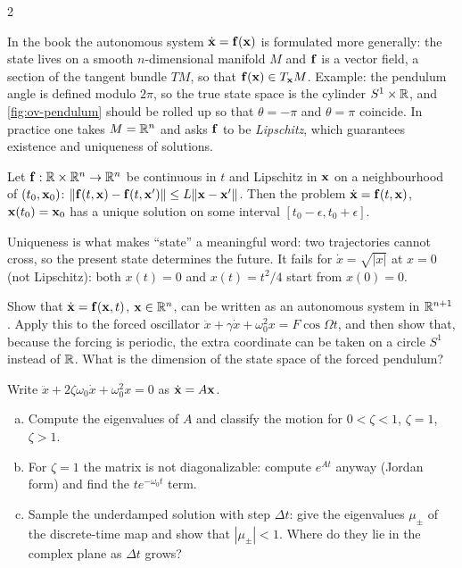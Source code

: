 \begin{paracol}{2}
\begin{secondary}
In the book the autonomous system $\dot{\mathbf{x}}=\mathbf{f}(\mathbf{x})$ is formulated more generally: the state
lives on a smooth $n$-dimensional manifold $M$ and $\mathbf{f}$ is a vector field, a section of the tangent
bundle $TM$, so that $\mathbf{f}(\mathbf{x})\in T_{\mathbf{x}}M$. Example: the pendulum angle is defined modulo
$2\pi$, so the true state space is the cylinder $S^1\times\mathbb{R}$, and \cref{fig:ov-pendulum} should be
rolled up so that $\theta=-\pi$ and $\theta=\pi$ coincide. In practice one takes $M=\mathbb{R}^n$ and asks
$\mathbf{f}$ to be \emph{Lipschitz}, which guarantees existence and uniqueness of solutions.
\begin{theorem}\label{thm:ov-picard}
Let $\mathbf{f}:\mathbb{R}\times\mathbb{R}^n\to\mathbb{R}^n$ be continuous in $t$ and Lipschitz in $\mathbf{x}$ on a neighbourhood of
$(t_0,\mathbf{x}_0)$: $\lVert\mathbf{f}(t,\mathbf{x})-\mathbf{f}(t,\mathbf{x}')\rVert\le L\lVert\mathbf{x}-\mathbf{x}'\rVert$. Then the
problem $\dot{\mathbf{x}}=\mathbf{f}(t,\mathbf{x})$, $\mathbf{x}(t_0)=\mathbf{x}_0$ has a unique solution on some interval
$[t_0-\epsilon,t_0+\epsilon]$.
\end{theorem}
Uniqueness is what makes ``state'' a meaningful word: two trajectories cannot cross, so the present
state determines the future. It fails for $\dot x=\sqrt{|x|}$ at $x=0$ (not Lipschitz): both $x(t)=0$
and $x(t)=t^2/4$ start from $x(0)=0$.
\end{secondary}

\begin{exercise}
Show that $\dot{\mathbf{x}}=\mathbf{f}(\mathbf{x},t)$, $\mathbf{x}\in\mathbb{R}^n$, can be written as an autonomous system in
$\mathbb{R}^{n+1}$. Apply this to the forced oscillator $\ddot x+\gamma\dot x+\omega_0^2x=F\cos\Omega t$, and
then show that, because the forcing is periodic, the extra coordinate can be taken on a circle
$S^1$ instead of $\mathbb{R}$. What is the dimension of the state space of the forced pendulum?
\end{exercise}

\begin{exercise}
Write $\ddot x+2\zeta\omega_0\dot x+\omega_0^2x=0$ as $\dot{\mathbf{x}}=A\mathbf{x}$.
\begin{enumerate}[(a)]
  \item Compute the eigenvalues of $A$ and classify the motion for $0<\zeta<1$, $\zeta=1$, $\zeta>1$.
  \item For $\zeta=1$ the matrix is not diagonalizable: compute $e^{At}$ anyway (Jordan form) and
        find the $te^{-\omega_0t}$ term.
  \item Sample the underdamped solution with step $\Delta t$: give the eigenvalues $\mu_\pm$ of the
        discrete-time map and show that $|\mu_\pm|<1$. Where do they lie in the complex plane as
        $\Delta t$ grows?
\end{enumerate}
\end{exercise}


\end{paracol}
